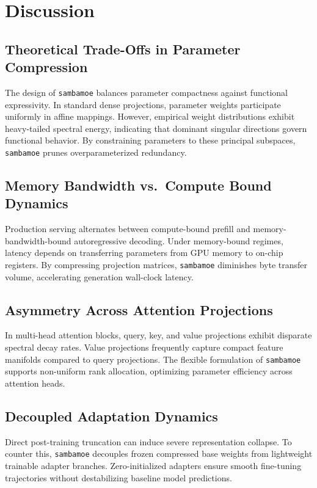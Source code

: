 \section{Discussion}

\subsection{Theoretical Trade-Offs in Parameter Compression}
The design of \texttt{sambamoe} balances parameter compactness against functional expressivity. In standard dense projections, parameter weights participate uniformly in affine mappings. However, empirical weight distributions exhibit heavy-tailed spectral energy, indicating that dominant singular directions govern functional behavior. By constraining parameters to these principal subspaces, \texttt{sambamoe} prunes overparameterized redundancy.

\subsection{Memory Bandwidth vs.\ Compute Bound Dynamics}
Production serving alternates between compute-bound prefill and memory-bandwidth-bound autoregressive decoding. Under memory-bound regimes, latency depends on transferring parameters from GPU memory to on-chip registers. By compressing projection matrices, \texttt{sambamoe} diminishes byte transfer volume, accelerating generation wall-clock latency.

\subsection{Asymmetry Across Attention Projections}
In multi-head attention blocks, query, key, and value projections exhibit disparate spectral decay rates. Value projections frequently capture compact feature manifolds compared to query projections. The flexible formulation of \texttt{sambamoe} supports non-uniform rank allocation, optimizing parameter efficiency across attention heads.

\subsection{Decoupled Adaptation Dynamics}
Direct post-training truncation can induce severe representation collapse. To counter this, \texttt{sambamoe} decouples frozen compressed base weights from lightweight trainable adapter branches. Zero-initialized adapters ensure smooth fine-tuning trajectories without destabilizing baseline model predictions.

